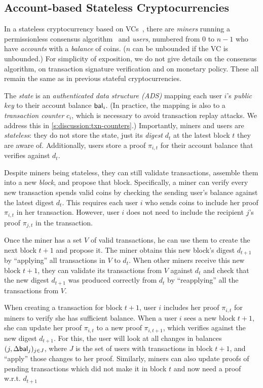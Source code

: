 \subsection{Account-based Stateless Cryptocurrencies}
\label{s:prelim:stateless-cryptocurrency}

In a stateless cryptocurrency based on VCs~\cite{CPZ18}, there are \textit{miners} running a permissionless consensus algorithm~\cite{Nakamoto08} and \textit{users}, numbered from $0$ to $n-1$ who have \textit{accounts} with a \textit{balance} of coins.
($n$ can be unbounded if the VC is unbounded.)
For simplicity of exposition, we do not give details on the consensus algorithm, on transaction signature verification and on monetary policy.
These all remain the same as in previous stateful cryptocurrencies.

The \textit{state} is an \textit{authenticated data structure (ADS)} mapping each user $i$'s \textit{public key} to their account balance $\mathsf{bal}_i$.
(In practice, the mapping is also to a \textit{transaction counter} $c_i$, which is necessary to avoid transaction replay attacks.
We address this in \cref{s:discussion:txn-counters}.)
Importantly, miners and users are \textit{stateless}: they do not store the state, just its \textit{digest} $d_t$ at the latest block $t$ they are aware of.
Additionally, users store a proof $\pi_{i,t}$ for their account balance that verifies against $d_t$.

Despite miners being stateless, they can still validate transactions, assemble them into a new \textit{block}, and propose that block.
Specifically, a miner can verify every new transaction spends valid coins by checking the sending user's balance against the latest digest $d_t$.
This requires each user $i$ who sends coins to include her proof $\pi_{i,t}$ in her transaction.
However, user $i$ does not need to include the recipient $j$'s proof $\pi_{j,t}$ in the transaction.

Once the miner has a set $V$ of valid transactions, he can use them to create the next block ${t+1}$ and propose it.
The miner obtains this new block's digest $d_{t+1}$ by ``applying'' all transactions in $V$ to $d_t$.
When other miners receive this new block ${t+1}$, they can validate its transactions from $V$ against $d_t$ and check that the new digest $d_{t+1}$ was produced correctly from $d_t$ by ``reapplying'' all the transactions from $V$.

When creating a transaction \tx for block $t+1$, user $i$ includes her proof $\pi_{i,t}$ for miners to verify she has sufficient balance.
When a user $i$ sees a new block ${t+1}$, she can update her proof $\pi_{i,t}$ to a new proof $\pi_{i,t+1}$, which verifies against the new digest $d_{t+1}$.
For this, the user will look at all changes in balances $(j, \Delta\mathsf{bal}_j)_{j\in J}$, where $J$ is the set of users with transactions in block ${t+1}$, and ``apply'' those changes to her proof.
Similarly, miners can also update proofs of pending transactions which did not make it in block $t$ and now need a proof w.r.t. $d_{t+1}$

